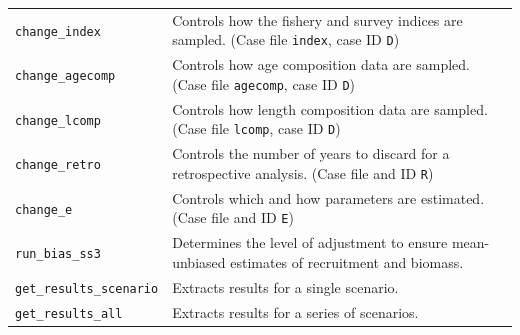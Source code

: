\documentclass[12pt]{article}
\begin{document}
\begin{table}[htpb]
\begin{tabular}{p{4.5cm}p{10cm}}
    \texttt{change\_index} &         Controls how the fishery and survey indices are sampled. (Case file \texttt{index}, case ID \texttt{D})\\

    \texttt{change\_agecomp} &       Controls how age composition data are sampled. (Case file \texttt{agecomp}, case ID \texttt{D})\\

    \texttt{change\_lcomp} &         Controls how length composition data are sampled. (Case file \texttt{lcomp}, case ID \texttt{D})\\

    \texttt{change\_retro} &         Controls the number of years to discard for a retrospective analysis. (Case file and ID \texttt{R})\\

    \texttt{change\_e} &             Controls which and how parameters are estimated. (Case file and ID \texttt{E})\\

    \texttt{run\_bias\_ss3} &         Determines the level of adjustment to ensure mean-unbiased estimates of recruitment and biomass.\\

    \texttt{get\_results\_scenario} & Extracts results for a single scenario.\\

    \texttt{get\_results\_all} &      Extracts results for a series of scenarios.\\
    \bottomrule
  \end{tabular}
\end{table}
\end{document}

